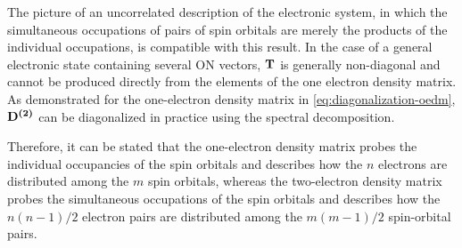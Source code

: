 The picture of an uncorrelated description of the electronic system, in which 
the simultaneous occupations of pairs of spin orbitals are merely the products 
of the individual occupations, is compatible with this result.
In the case of a general electronic state containing several ON vectors, $\boldsymbol{\mathrm{T}}$
is generally non-diagonal and cannot be produced directly from the elements of 
the one electron density matrix. As demonstrated for the one-electron density 
matrix in \cref{eq:diagonalization-oedm}, $ \boldsymbol{\mathrm{D^{\left( 2 \right)}}}$ can be diagonalized
in practice using the spectral decomposition.

Therefore, it can be stated that the one-electron density matrix probes the
individual occupancies of the spin orbitals and describes how the $n$ electrons
are distributed among the $m$ spin orbitals, whereas the two-electron density
matrix probes the simultaneous occupations of the spin orbitals and describes
how the $n\left( n-1 \right) /2$ electron pairs are distributed among the 
$m\left( m-1 \right) /2$ spin-orbital pairs.

